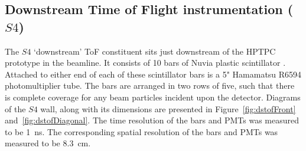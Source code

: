     

    



\subsection{Downstream Time of Flight instrumentation ($S4$)}
	
The $S4$ `downstream' ToF constituent sits just downstream of the HPTPC prototype in the beamline. It consists of 10 bars of Nuvia plastic scintillator \cite{NUVIA}. Attached to either end of each of these scintillator bars is a 5" Hamamatsu R6594 photomultiplier tube. The bars are arranged in two rows of five, such that there is complete coverage for any beam particles incident upon the detector. Diagrams of the $S4$ wall, along with its dimensions are presented in Figure~\ref{fig:dstofFront} and~\ref{fig:dstofDiagonal}. The time resolution of the bars and PMTs was measured to be 1~ns. The corresponding spatial resolution of the bars and PMTs was measured to be 8.3~cm.
    
